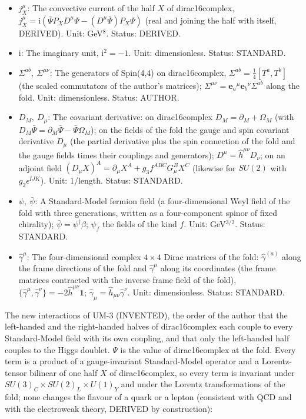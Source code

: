\documentclass[
  10pt,
]{article}
\begin{document}
\begin{itemize}
  labels the currents that are the sources of the gauge fields. Unit:
  GeV\(^3\). Status: STANDARD.
\item
  \(j_X^\mu\): The convective current of the half \(X\) of
  dirac16complex,
  \(j_X^\mu = \mathrm{i}(\bar\Psi P_XD^\mu\Psi - (D^\mu\bar\Psi)P_X\Psi)\)
  (real and joining the half with itself, DERIVED). Unit: GeV\(^8\).
  Status: DERIVED.
\item
  \(\mathrm{i}\): The imaginary unit, \(\mathrm{i}^2 = -1\). Unit:
  dimensionless. Status: STANDARD.
\item
  \(\Sigma^{ab},\ \Sigma^{\mu\nu}\): The generators of Spin(4,4) on
  dirac16complex, \(\Sigma^{ab} = \frac14[T^a, T^b]\) (the scaled
  commutators of the author's matrices);
  \(\Sigma^{\mu\nu} = \mathbf{e}_a{}^\mu\mathbf{e}_b{}^\nu\Sigma^{ab}\)
  along the fold. Unit: dimensionless. Status: AUTHOR.
\item
  \(D_M,\ D_\mu\): The covariant derivative: on dirac16complex
  \(D_M = \partial_M + \Omega_M\) (with
  \(D_M\bar\Psi = \partial_M\bar\Psi - \bar\Psi\Omega_M\)); on the
  fields of the fold the gauge and spin covariant derivative \(D_\mu\)
  (the partial derivative plus the spin connection of the fold and the
  gauge fields times their couplings and generators);
  \(D^\mu = \hat h^{\mu\nu}D_\nu\); on an adjoint field
  \((D_\mu X)^A = \partial_\mu X^A + g_3f^{ABC}G^B_\mu X^C\) (likewise
  for \(SU(2)\) with \(g_2\epsilon^{IJK}\)). Unit: 1/length. Status:
  STANDARD.
\item
  \(\psi,\ \bar\psi\): A Standard-Model fermion field (a
  four-dimensional Weyl field of the fold with three generations,
  written as a four-component spinor of fixed chirality);
  \(\bar\psi = \psi^\dagger\beta\); \(\psi_f\) the fields of the kind
  \(f\). Unit: GeV\(^{3/2}\). Status: STANDARD.
\item
  \(\hat\gamma^\mu\): The four-dimensional complex \(4 \times 4\) Dirac
  matrices of the fold: \(\hat\gamma^{(a)}\) along the frame directions
  of the fold and \(\hat\gamma^\mu\) along its coordinates (the frame
  matrices contracted with the inverse frame field of the fold),
  \(\{\hat\gamma^\mu, \hat\gamma^\nu\} = -2\hat h^{\mu\nu}\mathbf{1}\);
  \(\hat\gamma_\mu = \hat h_{\mu\nu}\hat\gamma^\nu\). Unit:
  dimensionless. Status: STANDARD.
\end{itemize}

The new interactions of UM-3 (INVENTED), the order of the author that
the left-handed and the right-handed halves of dirac16complex each
couple to every Standard-Model field with its own coupling, and that
only the left-handed half couples to the Higgs doublet. \(\Psi\) is the
value of dirac16complex at the fold. Every term is a product of a
gauge-invariant Standard-Model operator and a Lorentz-tensor bilinear of
one half \(X\) of dirac16complex, so every term is invariant under
\(SU(3)_C \times SU(2)_L \times U(1)_Y\) and under the Lorentz
transformations of the fold; none changes the flavour of a quark or a
lepton (consistent with QCD and with the electroweak theory, DERIVED by
construction):
\end{document}
